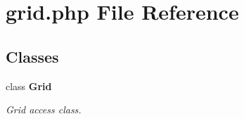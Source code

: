 \section{grid.php File Reference}
\label{grid_8php}
\subsection*{Classes}
\begin{CompactItemize}
\item 
class {\bf Grid}
\begin{CompactList}\small\item\em Grid access class. \item\end{CompactList}\end{CompactItemize}
